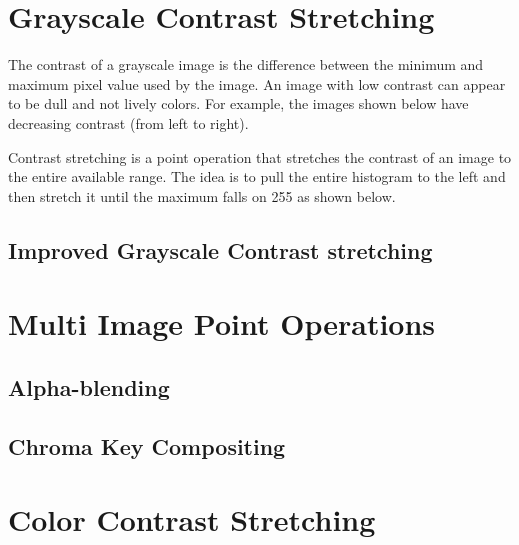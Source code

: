 \documentclass{book}
\begin{document}
\section{Grayscale Contrast Stretching}\label{sec:contrast-stretching}
The contrast of a grayscale image is the difference between the minimum and maximum pixel value used by the image. An image with low contrast can appear to be dull and not lively colors. For example,
the images shown below have decreasing contrast (from left to right).
\begin{center}
\end{center}
Contrast stretching is a point operation that stretches the contrast of an image to the entire available range. The idea is to pull the entire histogram to the left and then stretch it until the maximum falls on 255 as shown below.
\begin{center}
 \end{center}

\subsection*{Improved Grayscale Contrast stretching}

\section{Multi Image Point Operations}

\subsection{Alpha-blending}

\subsection{Chroma Key Compositing}

\section{Color Contrast Stretching}\label{sec:color-contrast-stretching}

\end{document}
